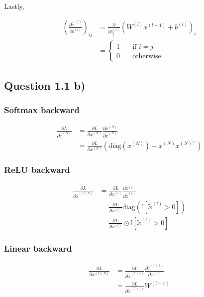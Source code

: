 \documentclass{article}
\begin{document}
Lastly,

\begin{align}
\left(\frac{\partial \tilde{x}^{(l)}}{\partial b^{(l)}}\right)_{ij}
&=
\frac{\partial}{\partial b^{(l)}_j}(W^{(l)}x^{(l-1)}+b^{(l)})_i \\
&=
\left\lbrace
\begin{matrix}
1\quad &\text{if } i = j\\
0\quad &\text{otherwise}
\end{matrix}
\right.
\end{align}

\subsection*{Question 1.1 b)}

\subsubsection*{Softmax backward}

\begin{align}
\frac{\partial L}{\partial\tilde{x}^{(N)}}
&=
\frac{\partial L}{\partial x^{(N)}}\frac{\partial x^{(N)}}{\partial \tilde{x}^{(N)}}\\
&=
\frac{\partial L}{\partial x^{(N)}}\left(\text{diag}(x^{(N)})-x^{(N)}{x^{(N)\top}}\right)
\end{align}

\subsubsection*{ReLU backward}

\begin{align}
\frac{\partial L}{\partial \tilde{x}^{(l<N)}} &= \frac{\partial L}{\partial x^{(l)}}\frac{\partial x^{(l)}}{\partial\tilde{x}^{(l)}}\\
&= \frac{\partial L}{\partial x^{(l)}}\text{diag}(\mathbb{I}[\tilde{x}^{(l)}>0])\\
&= \frac{\partial L}{\partial x^{(l)}}\odot\mathbb{I}[\tilde{x}^{(l)}>0]
\end{align}

\subsubsection*{Linear backward}

\begin{align*}
\frac{\partial L}{\partial x^{(l<N)}} &= \frac{\partial L}{\partial\tilde{x}^{(l+1)}}\frac{\partial\tilde{x}^{(l+1)}}{\partial x^{(l)}} \\
&= \frac{\partial L}{\partial\tilde{x}^{(l+1)}}W^{(l+1)}
\end{align*}
\end{document}
